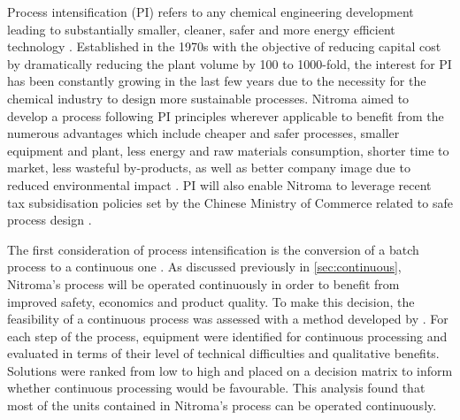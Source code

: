 Process intensification (PI) refers to any chemical engineering development leading to substantially smaller, cleaner, safer and more energy efficient technology \cite{reay_chapter_2008}. Established in the 1970s with the objective of reducing capital cost by dramatically reducing the plant volume by 100 to 1000-fold, the interest for PI has been constantly growing in the last few years due to the necessity for the chemical industry to design more sustainable processes. Nitroma aimed to develop a process following PI principles wherever applicable to benefit from the numerous advantages which include cheaper and safer processes, smaller equipment and plant, less energy and raw materials consumption, shorter time to market, less wasteful by-products, as well as better company image due to reduced environmental impact \cite{reay_chapter_2008}. PI will also enable Nitroma to leverage recent tax subsidisation policies set by the Chinese Ministry of Commerce related to safe process design \cite{nanjing_economic_and_technological_development_zone_administration_committee_public_2019}.  

The first consideration of process intensification is the conversion of a batch process to a continuous one \cite{randall_process_2020}. As discussed previously in \cref{sec:continuous}, Nitroma's process will be operated continuously in order to benefit from improved safety, economics and product quality. To make this decision, the feasibility of a continuous process was assessed with a method developed by \textcite{teoh_practical_2016}. For each step of the process, equipment were  identified for continuous processing and evaluated in terms of their level of technical difficulties and qualitative benefits. Solutions were ranked from low to high and placed on a decision matrix to inform whether continuous processing would be favourable. This analysis found that most of the units contained in Nitroma's process can be operated continuously.

